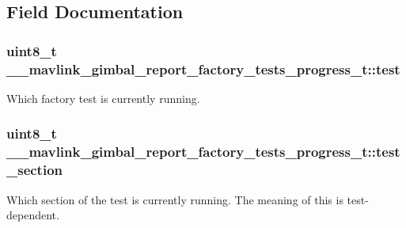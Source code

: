 \subsection{Field Documentation}
\hypertarget{struct____mavlink__gimbal__report__factory__tests__progress__t_acc85d19014b29df419bd5f117b3cd7e3}{
\subsubsection[{test}]{\setlength{\rightskip}{0pt plus 5cm}uint8\+\_\+t \+\_\+\+\_\+mavlink\+\_\+gimbal\+\_\+report\+\_\+factory\+\_\+tests\+\_\+progress\+\_\+t\+::test}}\label{struct____mavlink__gimbal__report__factory__tests__progress__t_acc85d19014b29df419bd5f117b3cd7e3}


Which factory test is currently running. 

\hypertarget{struct____mavlink__gimbal__report__factory__tests__progress__t_a6eaddd7ec3e423b48e056b96c3bbc639}{
\subsubsection[{test\+\_\+section}]{\setlength{\rightskip}{0pt plus 5cm}uint8\+\_\+t \+\_\+\+\_\+mavlink\+\_\+gimbal\+\_\+report\+\_\+factory\+\_\+tests\+\_\+progress\+\_\+t\+::test\+\_\+section}}\label{struct____mavlink__gimbal__report__factory__tests__progress__t_a6eaddd7ec3e423b48e056b96c3bbc639}


Which section of the test is currently running. The meaning of this is test-\/dependent. 

